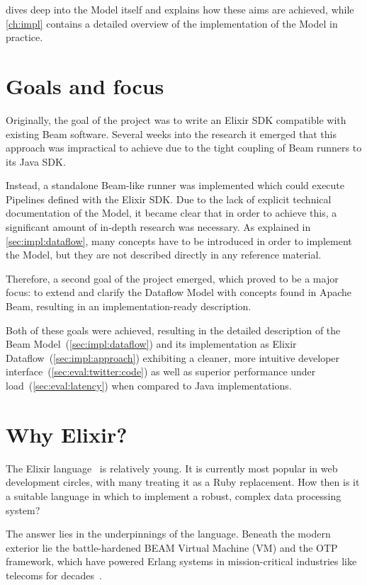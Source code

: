  dives deep into the Model itself and explains how these aims are achieved, while \cref{ch:impl} contains a detailed overview of the implementation of the Model in practice.

\section{Goals and focus}\label{sec:intro:goals}\label{sec:intro:results}

Originally, the goal of the project was to write an Elixir SDK compatible with existing Beam software.
Several weeks into the research it emerged that this approach was impractical to achieve due to the tight coupling of Beam runners to its Java SDK.

Instead, a standalone Beam-like runner was implemented which could execute Pipelines defined with the Elixir SDK.
Due to the lack of explicit technical documentation of the Model, it became clear that in order to achieve this, a significant amount of in-depth research was necessary.
As explained in \cref{sec:impl:dataflow}, many concepts have to be introduced in order to implement the Model, but they are not described directly in any reference material.

Therefore, a second goal of the project emerged, which proved to be a major focus: to extend and clarify the Dataflow Model with concepts found in Apache Beam, resulting in an implementation-ready description.

Both of these goals were achieved, resulting in the detailed description of the Beam Model~(\cref{sec:impl:dataflow}) and its implementation as Elixir Dataflow~(\cref{sec:impl:approach}) exhibiting a cleaner, more intuitive developer interface~(\cref{sec:eval:twitter:code}) as well as superior performance under load~(\cref{sec:eval:latency}) when compared to Java implementations.

\section{Why Elixir?}\label{sec:intro:elixir}

The Elixir language~\cite{Elixir} is relatively young.
It is currently most popular in web development circles, with many treating it as a Ruby replacement.
How then is it a suitable language in which to implement a robust, complex data processing system?

The answer lies in the underpinnings of the language.
Beneath the modern exterior lie the battle-hardened BEAM Virtual Machine (VM) and the OTP framework, which have powered Erlang systems in mission-critical industries like telecoms for decades~\cite[p.~383]{scalability_erlang_otp}.

